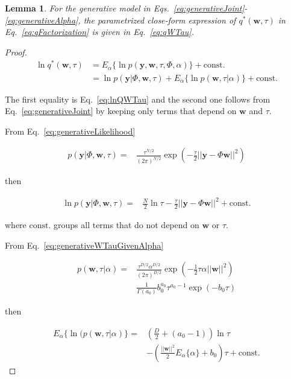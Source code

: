 \documentclass[12pt]{article}
\newtheorem{lemmaQWTau}{Lemma}
\newlength\mystoreparindent
\newenvironment{myparindent}[1]{%
\setlength{\mystoreparindent}{\the\parindent}
\setlength{\parindent}{#1}
}{%
\setlength{\parindent}{\mystoreparindent}
}
\begin{document}
\begin{lemmaQWTau}
\label{lemma:qWTau}
For the generative model in Eqs.~\ref{eq:generativeJoint}-\ref{eq:generativeAlpha}, the parametrized close-form
expression of $q^*(\mathbf{w},\tau)$ in Eq.~\ref{eq:qFactorization} is given in
Eq.~\ref{eq:qWTau}.
\end{lemmaQWTau}

\begin{myparindent}{0pt}
\begin{proof}

\begin{align}
\ln q^*(\mathbf{w},\tau)&=E_{\alpha}\{\ln p(\mathbf{y},\mathbf{w},\tau,\Phi,\alpha)\}+\text{const.}\nonumber\\
&=\ln p(\mathbf{y}|\Phi,\mathbf{w},\tau)+E_{\alpha}\{\ln p(\mathbf{w},\tau|\alpha)\}+\text{const.}\label{eq:lnQWTauExpaned}
\end{align}

The first equality is Eq.~\ref{eq:lnQWTau} and the second one follows from
Eq.~\ref{eq:generativeJoint} by keeping only terms that depend on $\mathbf{w}$
and $\tau$. 

From Eq.~\ref{eq:generativeLikelihood}

\begin{align}
p(\mathbf{y}|\Phi,\mathbf{w},\tau)=&\frac{\tau^{N/2}}{(2\pi)^{N/2}}\exp\left(-\frac{\tau}{2}||\mathbf{y}-\Phi\mathbf{w}||^2\right)\nonumber
\end{align}

then

\begin{align}
\ln p(\mathbf{y}|\Phi,\mathbf{w},\tau)=&\frac{N}{2}\ln\tau-\frac{\tau}{2}||\mathbf{y}-\Phi\mathbf{w}||^2+\text{const.}\label{eq:likelihoodExpanded}
\end{align}

where $\text{const.}$ groups all terms that do not depend on
$\mathbf{w}$ or $\tau$. 

From Eq.~\ref{eq:generativeWTauGivenAlpha}

\begin{align}
p(\mathbf{w},\tau|\alpha)=&\frac{\tau^{D/2}\alpha^{D/2}}{(2\pi)^{D/2}}\exp\left(-\frac{1}{2}\tau\alpha||\mathbf{w}||^2\right)\nonumber\\
&\frac{1}{\Gamma(a_0)}b_0^{a_0}\tau^{a_0-1}\exp(-b_0\tau)\label{eq:pWTauGivenAlpha}
\end{align}

then

\begin{align}
E_\alpha\{\ln(p(\mathbf{w},\tau|\alpha)\}=&\left(\frac{D}{2}+(a_0-1)\right)\ln\tau\nonumber\\
                              &-\left(\frac{||\mathbf{w}||^2}{2}E_\alpha\{\alpha\}+b_0\right)\tau+\text{const.}\label{eq:eWRTAlphaLnPWTau}
\end{align}


\end{proof}
\end{myparindent}
\end{document}
